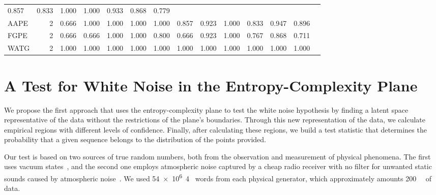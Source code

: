 \documentclass[a4,11pt]{pssbmac}
\begin{document}
\begin{table*}
{\begin{tabular}{lrrrr*9{r}}
		0.857 & 0.833 & 1.000 & 1.000 &
		0.933 & 0.868 & 0.779\\ 
		AAPE & 2 & 
		0.666 & 1.000 & 1.000 & 1.000 &
		1.000 & 0.857 & 0.923 & 1.000 &
		0.833 & 0.947 & 0.896\\ 
		FGPE & 2 & 
		0.666 & 0.666 & 1.000 & 1.000 &
		0.800 & 0.666 & 0.923 & 1.000 &
		0.767 & 0.868 & 0.711\\ 
		\cmidrule(lr){1-1}
		\cmidrule(lr){2-2}
		\cmidrule(lr){3-6}
		\cmidrule(lr){7-10}
		\cmidrule(lr){11-11}
		\cmidrule(lr){12-12}
		\cmidrule(lr){13-13}
		WATG & 2 & 
		1.000 & 1.000 & 1.000 & 1.000 &
		1.000 & 1.000 & 1.000 & 1.000 &
		1.000 & 1.000 & 1.000\\
		\bottomrule
	\end{tabular}
	}
\end{table*}

\section{A Test for White Noise in the Entropy-Complexity Plane}\label{HC-PCA}

We propose the first approach that uses the entropy-complexity plane to test the white noise hypothesis by finding a latent space representative of the data without the restrictions of the plane's boundaries.
Through this new representation of the data, we calculate empirical regions with different levels of confidence.
Finally, after calculating these regions, we build a test statistic that determines the probability that a given sequence belongs to the distribution of the points provided.

Our test is based on two sources of true random numbers, both from the observation and measurement of physical phenomena.
The first uses vacuum states~\cite{RNGVacuumStates}, and the second one employs atmospheric noise captured by a cheap radio receiver with no filter for unwanted static sounds caused by atmospheric noise~\cite{RandomOrg}.
We used \SI{54e6}{4\byte} words from each physical generator, which approximately amounts \SI{200}{\mega\byte} of data.
\end{document}
